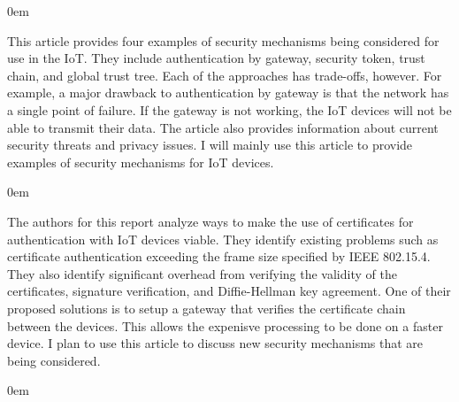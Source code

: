 \documentclass{article}
\newenvironment{annotation}{\begin{addmargin}[2.5em]{0em} \begin{flushleft}}{\end{flushleft} \end{addmargin}}
\begin{document}
\begin{annotation}
This article provides four examples of security mechanisms being considered for use in the IoT. They include authentication by gateway, security token, trust chain, and global trust tree. Each of the 
approaches has trade-offs, however.
For example, a major drawback to authentication by gateway is that the network has a single point of failure. If the gateway is not working, the IoT devices will not be able to transmit their data.
 The article also provides information about current security threats and privacy issues. I will mainly use this article to provide examples of security mechanisms for
IoT devices. 
\end{annotation}

\begin{annotation}
The authors for this report analyze ways to make the use of certificates for authentication with IoT devices viable. They identify existing problems such as certificate authentication exceeding the
frame size specified by IEEE 802.15.4. They also identify significant overhead from verifying the validity of the certificates, signature verification, and Diffie-Hellman key agreement. One of their
proposed solutions is to setup a gateway that verifies the certificate chain between the devices. This allows the expenisve processing to be done on a faster device. I plan to use this article to discuss
new security mechanisms that are being considered.
\end{annotation}

\begin{annotation}

\end{annotation}
\end{document}
